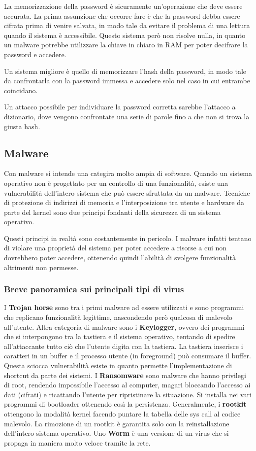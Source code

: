 \documentclass[a4paper]{article}
\begin{document}
La memorizzazione della password è sicuramente un'operazione che deve essere accurata. La prima assunzione che occorre fare è che la password debba essere cifrata prima di venire salvata, in modo tale da evitare il problema di una lettura quando il sistema è accessibile. Questo sistema però non risolve nulla, in quanto un malware potrebbe utilizzare la chiave in chiaro in RAM per poter decifrare la password e accedere.

Un sistema migliore è quello di memorizzare l’hash della password, in modo tale da confrontarla con la password immessa e accedere solo nel caso in cui entrambe coincidano.

Un attacco possibile per individuare la password corretta sarebbe l'attacco a dizionario, dove vengono confrontate una serie di
parole fino a che non si trova la giusta hash.

\subsection{Malware}
Con malware si intende una categira molto ampia di software. Quando un sistema operativo non è progettato per un controllo di una funzionalità, esiste una vulnerabilità dell'intero sistema che può essere sfruttata da un malware. Tecniche di protezione di indirizzi di memoria e l'interposizione tra utente e hardware da parte del kernel sono due principi fondanti della sicurezza di un sistema operativo.

Questi principi in realtà sono costantemente in pericolo. I malware infatti tentano di violare una proprietà del sistema per poter accedere a risorse a cui non dovrebbero poter accedere, ottenendo quindi l'abilità di svolgere funzionalità altrimenti non permesse.

\subsubsection{Breve panoramica sui principali tipi di virus}
I \textbf{Trojan horse} sono tra i primi malware ad essere utilizzati e sono programmi che replicano funzionalità legittime, nascondendo però qualcosa di malevolo all'utente. Altra categoria di malware sono i \textbf{Keylogger}, ovvero dei programmi che si interpongono tra la tastiera e il sistema operativo, tentando di spedire all'attaccante tutto ciò che l'utente digita con la tastiera. La tastiera inserisce i caratteri in un buffer e il processo utente (in foreground) può consumare il buffer. Questa sciocca vulnerabilità esiste in quanto permette l'implementazione di shortcut da parte dei sistemi. I \textbf{Ransomware} sono malware che hanno privilegi di root, rendendo impossibile l'accesso al computer, magari bloccando l'accesso ai dati (cifrati) e ricattando l'utente per ripristinare la situazione. Si installa nei vari programmi di bootloader ottenendo così la persistenza. Generalmente, i \textbf{rootkit} ottengono la modalità kernel facendo puntare la tabella delle sys call al codice malevolo. La rimozione di un rootkit è garantita solo con la reinstallazione dell'intero sistema operativo. Uno \textbf{Worm} è una versione di un virus che si propaga in maniera molto veloce tramite la rete.
\end{document}
